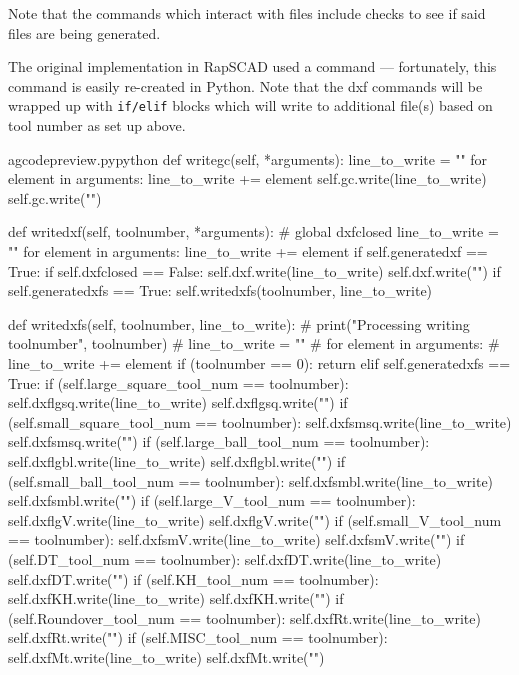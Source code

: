 \documentclass{ltxdoc}
\begin{document}
Note that the commands which interact with files include checks to see if said files are being generated.
   
The original implementation in {RapSCAD} used a command  --- fortunately, this command is easily re-created in Python. Note that the dxf commands will be wrapped up with \verb|if/elif| blocks which will write to additional file(s) based on tool number as set up above.

\lstset{firstnumber=\thegcpy}
\begin{writecode}{a}{gcodepreview.py}{python}
    def writegc(self, *arguments):
        line_to_write = ""
        for element in arguments:
            line_to_write += element
        self.gc.write(line_to_write)
        self.gc.write("\n")

    def writedxf(self, toolnumber, *arguments):
#        global dxfclosed
        line_to_write = ""
        for element in arguments:
            line_to_write += element
        if self.generatedxf == True:
            if self.dxfclosed == False:
                self.dxf.write(line_to_write)
                self.dxf.write("\n")
        if self.generatedxfs == True:
            self.writedxfs(toolnumber, line_to_write)

    def writedxfs(self, toolnumber, line_to_write):
#        print("Processing writing toolnumber", toolnumber)
#        line_to_write = ""
#        for element in arguments:
#            line_to_write += element
        if (toolnumber == 0):
            return
        elif self.generatedxfs == True:
            if (self.large_square_tool_num == toolnumber):
                self.dxflgsq.write(line_to_write)
                self.dxflgsq.write("\n")
            if (self.small_square_tool_num == toolnumber):
                self.dxfsmsq.write(line_to_write)
                self.dxfsmsq.write("\n")
            if (self.large_ball_tool_num == toolnumber):
                self.dxflgbl.write(line_to_write)
                self.dxflgbl.write("\n")
            if (self.small_ball_tool_num == toolnumber):
                self.dxfsmbl.write(line_to_write)
                self.dxfsmbl.write("\n")
            if (self.large_V_tool_num == toolnumber):
                self.dxflgV.write(line_to_write)
                self.dxflgV.write("\n")
            if (self.small_V_tool_num == toolnumber):
                self.dxfsmV.write(line_to_write)
                self.dxfsmV.write("\n")
            if (self.DT_tool_num == toolnumber):
                self.dxfDT.write(line_to_write)
                self.dxfDT.write("\n")
            if (self.KH_tool_num == toolnumber):
                self.dxfKH.write(line_to_write)
                self.dxfKH.write("\n")
            if (self.Roundover_tool_num == toolnumber):
                self.dxfRt.write(line_to_write)
                self.dxfRt.write("\n")
            if (self.MISC_tool_num == toolnumber):
                self.dxfMt.write(line_to_write)
                self.dxfMt.write("\n")

\end{writecode}
\addtocounter{gcpy}{58}
\end{document}
